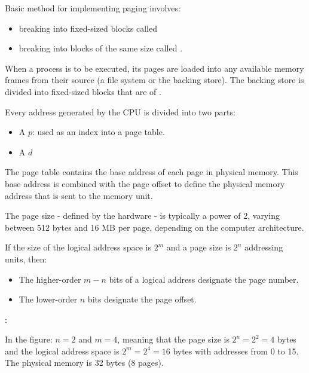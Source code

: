     \par Basic method for implementing paging involves:
    \begin{itemize}
      \item breaking  into fixed-sized blocks called 
      \item breaking  into blocks of the same size called .
    \end{itemize}
    \par When a process is to be executed, its pages are loaded into any available memory frames from their source (a file system or the backing store). The backing store is divided into fixed-sized
blocks that are of .

    \par Every address generated by the CPU is divided into two parts:
    \begin{itemize}
      \item A  $p$: used as an index into a page table.
      \item A  $d$
    \end{itemize}
    
    \par The page table contains the base address of each page in physical memory. This base address is combined with the page offset to define the physical memory address that is sent to the memory unit.

    \par The page size - defined by the hardware - is typically a power of 2, varying between 512 bytes and 16 MB per page, depending on the computer architecture.

    \par If the size of the logical address space is $2^{m}$ and a page size is $2^{n}$ addressing units, then:
    \begin{itemize}
      \item The higher-order $m - n$ bits of a logical address designate the page number.
      \item The lower-order $n$ bits designate the page offset.
    \end{itemize}

    \par {}:

    \par In the figure: $n = 2$ and $m = 4$, meaning that the page size is $2^n = 2^2 = 4$ bytes and the logical address space is $2^m = 2^4 = 16$ bytes with addresses from 0 to 15. The physical memory is 32 bytes (8 pages).

